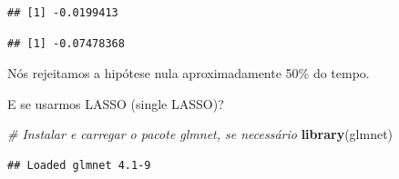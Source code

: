 \documentclass[
]{article}
\newenvironment{Shaded}{\begin{snugshade}}{\end{snugshade}}
\newcommand{\CommentTok}[1]{\textcolor[rgb]{0.56,0.35,0.01}{\textit{#1}}}
\newcommand{\FunctionTok}[1]{\textcolor[rgb]{0.13,0.29,0.53}{\textbf{#1}}}
\newcommand{\NormalTok}[1]{#1}
\newcommand{\SpecialCharTok}[1]{\textcolor[rgb]{0.81,0.36,0.00}{\textbf{#1}}}
\begin{document}
\begin{verbatim}
## [1] -0.0199413
\end{verbatim}

\begin{Shaded}
\end{Shaded}

\begin{verbatim}
## [1] -0.07478368
\end{verbatim}

Nós rejeitamos a hipótese nula aproximadamente 50\% do tempo.

E se usarmos LASSO (single LASSO)?

\begin{Shaded}
\begin{Highlighting}[]
\CommentTok{\# Instalar e carregar o pacote glmnet, se necessário}
\FunctionTok{library}\NormalTok{(glmnet)}
\end{Highlighting}
\end{Shaded}

\begin{verbatim}
## Loaded glmnet 4.1-9
\end{verbatim}
\end{document}
